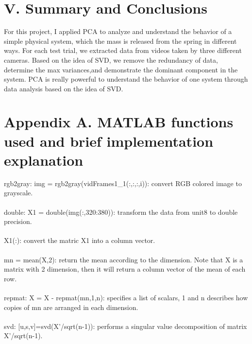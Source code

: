 \documentclass[12pt,letterpaper]{article}
\begin{document}
\section*{V. Summary and Conclusions}
For this project, I applied PCA to analyze and understand the behavior of a simple physical system, which the mass is released from the spring in different ways. For each test trial, we extracted data from videos taken by three different cameras. Based on the idea of SVD, we remove the redundancy of data, determine the max variances,and demonstrate the dominant component in the system. PCA is really powerful to understand the behavior of one system through data analysis based on the idea of SVD. 
\newpage
\section*{Appendix A. MATLAB functions used and brief implementation explanation}
rgb2gray: img = rgb2gray(vidFrames1\_1(:,:,:,i)): convert RGB colored image to grayscale.
\\
\\double: X1 = double(img(:,320:380)): transform the data from unit8 to double precision. 
\\
\\X1(:): convert the matric X1 into a column vector. 
\\
\\mn = mean(X,2): return the mean according to the dimension. Note that X is a matrix with 2 dimension, then it will return a column vector of the mean of each row. 
\\
\\repmat: X = X - repmat(mn,1,n): specifies a list of scalars, 1 and n describes how copies of mn are arranged in each dimension. 
\\
\\svd: [u,s,v]=svd(X'/sqrt(n-1)): performs a singular value decomposition of matrix X'/sqrt(n-1). 
\newpage
\end{document}
